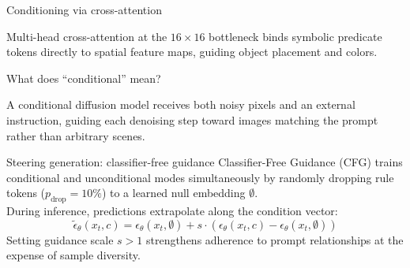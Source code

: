 \documentclass[aspectratio=169,11pt]{beamer}
\begin{document}
\begin{frame}{Conditioning via cross-attention}
\begin{center}\end{center}
\vspace{1mm}
\normalsize Multi-head cross-attention at the $16\times16$ bottleneck binds symbolic predicate tokens directly to spatial feature maps, guiding object placement and colors.
\end{frame}

\begin{frame}{What does ``conditional'' mean?}
\begin{center}\end{center}
\vspace{2mm}
\normalsize A conditional diffusion model receives both noisy pixels and an external instruction, guiding each denoising step toward images matching the prompt rather than arbitrary scenes.
\end{frame}

\begin{frame}{Steering generation: classifier-free guidance}
\normalsize Classifier-Free Guidance (CFG) trains conditional and unconditional modes simultaneously by randomly dropping rule tokens ($p_{\text{drop}} = 10\%$) to a learned null embedding $\emptyset$.
\vspace{2mm}\\
During inference, predictions extrapolate along the condition vector:
\[\tilde{\epsilon}_\theta(x_t, c) = \epsilon_\theta(x_t, \emptyset) + s \cdot \left(\epsilon_\theta(x_t, c) - \epsilon_\theta(x_t, \emptyset)\right)\]
\small Setting guidance scale $s > 1$ strengthens adherence to prompt relationships at the expense of sample diversity.
\end{frame}
\end{document}
